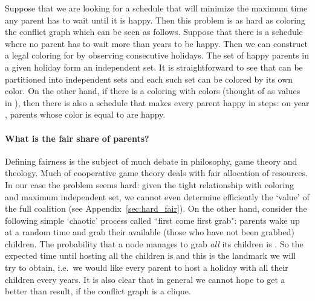 \documentclass[11pt]{article}
\begin{document}
Suppose that we are looking for a schedule that will minimize the
maximum time any parent has to wait until it is happy. Then this
problem is as hard as coloring the conflict graph  which can be
seen as follows. Suppose that there is a schedule where no parent has
to wait more than  years to be happy. Then we can construct a legal
coloring for  by observing  consecutive holidays. The set of
happy parents in a given holiday form an independent set. It is
straightforward to see that  can be partitioned into 
independent sets and each such set can be colored by its own color. On
the other hand, if there is a coloring with  colors (thought of as
values in ), then there is also a schedule that
makes every parent happy in  steps: on year , parents whose color
is equal to  are happy.

\paragraph{What is the fair share of parents?} Defining fairness is the subject of much debate in philosophy, game theory and theology. Much of cooperative game theory deals with fair allocation of resources. In our case the problem seems hard: given the tight relationship with coloring and maximum independent set, we cannot even determine efficiently the `value' of the full coalition (see Appendix~\ref{sec:hard_fair}). On the other hand, consider the following simple `chaotic' process called ``first come first grab": parents wake up at a random time and grab their available (those who have not been grabbed) children. The probability that a node  manages to grab {\em all} its children is . So the expected time until hosting all the children is  and this is the landmark we will try to obtain, i.e.\ we would like every parent to host a holiday with all their children every  years. It is also clear that in general we cannot hope to get a better than  result, if the conflict graph is a clique.
\end{document}

